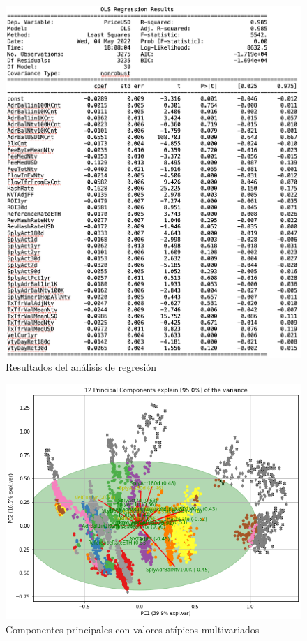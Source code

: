 \begin{figure}
	\centering
	\includegraphics[scale=0.7]{Chapter5/OLS.png}
	\caption{Resultados del análisis de regresión}
	\label{fig10}
\end{figure}

\begin{figure}
	\centering
	\includegraphics[scale=0.6]{Chapter5/pca_val_atipi.png}
	\caption{Componentes principales con valores atípicos multivariados}
	\label{fig12}
\end{figure}


